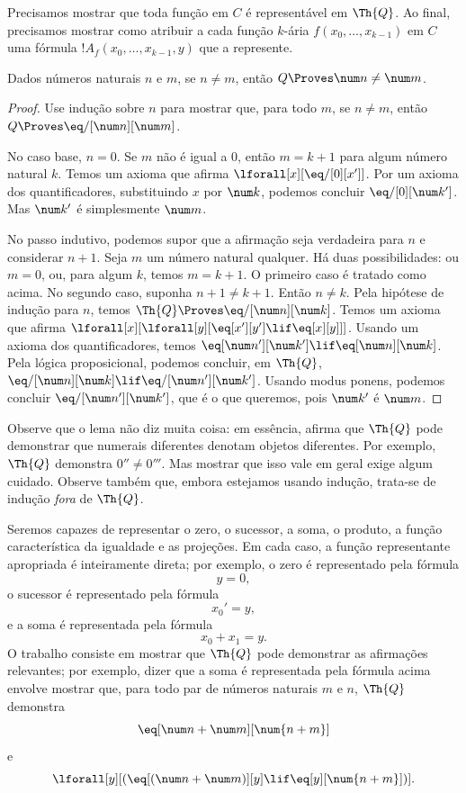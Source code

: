 \documentclass[../../../include/open-logic-section]{subfiles}
\begin{document}

Precisamos mostrar que toda função em $C$ é representável em $\Th{Q}$.
Ao final, precisamos mostrar como atribuir a cada função $k$-ária
$f(x_0,\dots,x_{k-1})$ em $C$ uma fórmula
$!A_f(x_0,\dots,x_{k-1},y)$ que a represente.

\begin{lem}
Dados números naturais $n$ e $m$, se $n \neq m$, então $Q \Proves \num
n \neq \num m$.
\end{lem}

\begin{proof}
Use indução sobre $n$ para mostrar que, para todo $m$, se $n \neq m$, então
$Q \Proves \eq/[\num n][\num m]$.

No caso base, $n = 0$. Se $m$ não é igual a $0$, então $m = k + 1$ para
algum número natural $k$. Temos um axioma que afirma
$\lforall[x][\eq/[0][x']]$. Por um axioma dos quantificadores, substituindo
$x$ por $\num k$, podemos concluir $\eq/[0][\num k']$. Mas $\num k'$ é
simplesmente $\num m$.

No passo indutivo, podemos supor que a afirmação seja verdadeira para $n$ e
considerar $n+1$. Seja $m$ um número natural qualquer. Há duas
possibilidades: ou $m = 0$, ou, para algum $k$, temos $m = k+1$. O primeiro
caso é tratado como acima. No segundo caso, suponha $n+1 \neq k+1$. Então
$n \neq k$. Pela hipótese de indução para $n$, temos
$\Th{Q} \Proves \eq/[\num n][\num k]$. Temos um axioma que afirma
$\lforall[x][\lforall[y][\eq[x'][y'] \lif \eq[x][y]]]$. Usando um axioma
dos quantificadores, temos $\eq[\num n'][\num k'] \lif \eq[\num n][\num
  k]$. Pela lógica proposicional, podemos concluir, em $\Th{Q}$,
$\eq/[\num n][\num k] \lif \eq/[\num n'][\num k']$. Usando modus ponens,
podemos concluir $\eq/[\num n'][\num k']$, que é o que queremos, pois
$\num k'$ é $\num m$.
\end{proof}

Observe que o lema não diz muita coisa: em essência, afirma que $\Th{Q}$
pode demonstrar que numerais diferentes denotam objetos diferentes. Por
exemplo, $\Th{Q}$ demonstra $0'' \neq 0'''$. Mas mostrar que isso vale em
geral exige algum cuidado. Observe também que, embora estejamos usando
indução, trata-se de indução \emph{fora} de $\Th{Q}$.

Seremos capazes de representar o zero, o sucessor, a soma, o produto, a
função característica da igualdade e as projeções. Em cada caso, a função
representante apropriada é inteiramente direta; por exemplo, o zero é
representado pela fórmula
\[
y = 0,
\]
o sucessor é representado pela fórmula
\[
x_0' = y,
\]
e a soma é representada pela fórmula
\[
x_0 + x_1 = y.
\]
O trabalho consiste em mostrar que $\Th{Q}$ pode demonstrar as afirmações
relevantes; por exemplo, dizer que a soma é representada pela fórmula acima
envolve mostrar que, para todo par de números naturais $m$ e $n$, $\Th{Q}$
demonstra
\[
\eq[\num n + \num m][\num {n+m}]
\]
e
\[
\lforall[y][(\eq[(\num n + \num m)][y] \lif \eq[y][\num {n+m}])].
\]
\end{document}
